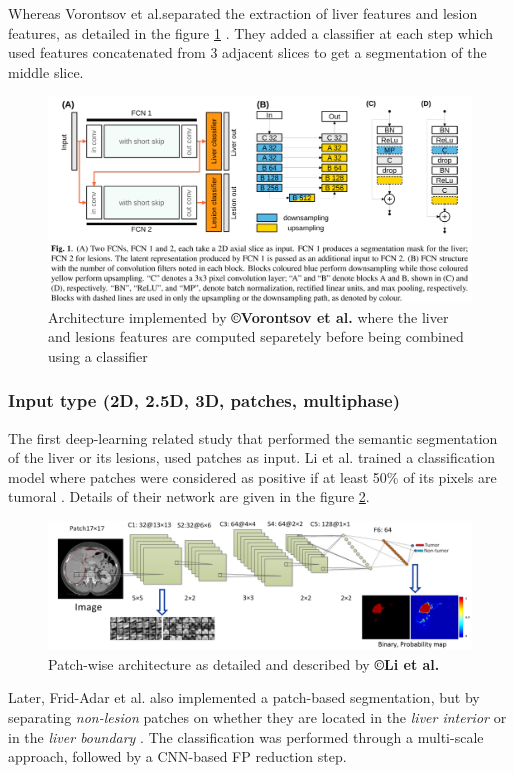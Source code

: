 \documentclass[]{article}
\begin{document}
	
	Whereas Vorontsov et al.separated the extraction of liver
	features and lesion features, as detailed in the figure \ref{Vorontsov2018_Fig1} \cite{Vorontsov2018}. They
	added a classifier at each step which used features concatenated from 3
	adjacent slices to get a segmentation of the middle slice.
	
	\begin{figure}[th!]
		\centering
		\includegraphics[width=0.7\linewidth]{images/image17}
		\caption{Architecture implemented by \textbf{©Vorontsov et al.} where the liver and lesions features are computed separetely before being combined using a classifier \cite{Vorontsov2018}}
		\label{Vorontsov2018_Fig1}
	\end{figure}
	
	
	\subsubsection*{Input type (2D, 2.5D, 3D, patches, multiphase)}
	
	The first deep-learning related study that performed the semantic
	segmentation of the liver or its lesions, used patches as input.
	Li et al. trained a classification model where patches were
	considered as positive if at least 50\% of its pixels are tumoral \cite{Li2015}.
	Details of their network are given in the figure \ref{Li2015_Patch_fig}.
	
	\begin{figure}[th!]
		\centering
		\includegraphics[width=0.7\linewidth]{images/image2}
		\caption{Patch-wise architecture as detailed and described by \textbf{©Li et al.} \cite{Li2015}}
		\label{Li2015_Patch_fig}
	\end{figure}
	
	
	Later, Frid-Adar et al. also implemented a patch-based
	segmentation, but by separating \emph{non-lesion} patches on whether
	they are located in the \emph{liver interior} or in the \emph{liver
		boundary} \cite{Frid-adar2017}. The classification was performed through a multi-scale
	approach, followed by a CNN-based FP reduction step.
	
\end{document}
